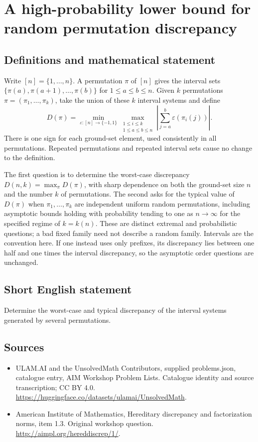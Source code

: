 \documentclass[11pt,a4paper]{article}
\begin{document}
\section*{A high-probability lower bound for random permutation discrepancy}\label{statement}

\subsection{Definitions and mathematical statement}
Write $[n]=\{1,\ldots,n\}$. A permutation $\pi$ of $[n]$ gives the
interval sets $\{\pi(a),\pi(a+1),\ldots,\pi(b)\}$ for
$1\le a\le b\le n$. Given $k$ permutations
$\pi=(\pi_1,\ldots,\pi_k)$, take the union of these $k$
interval systems and define
\[
 D(\pi)=\min_{\varepsilon:[n]\to\{-1,1\}}
 \max_{\substack{1\le i\le k\\1\le a\le b\le n}}
 \left|\sum_{j=a}^b\varepsilon(\pi_i(j))\right|.
\]
There is one sign for each ground-set element, used consistently in all
permutations. Repeated permutations and repeated interval sets cause no
change to the definition.

The first question is to determine the worst-case discrepancy
$D(n,k)=\max_{\pi}D(\pi)$, with sharp dependence
on both the ground-set size $n$ and the number $k$ of permutations.
The second asks for the typical value of $D(\pi)$ when
$\pi_1,\ldots,\pi_k$ are independent uniform random permutations,
including asymptotic bounds holding with probability tending to one as
$n\to\infty$ for the specified regime of $k=k(n)$.
These are distinct extremal and probabilistic questions; a bad fixed
family need not describe a random family. Intervals are the convention
here. If one instead uses only prefixes, its discrepancy lies between
one half and one times the interval discrepancy, so the asymptotic
order questions are unchanged.
\subsection{Short English statement}
Determine the worst-case and typical discrepancy of the interval systems generated by several permutations.
\subsection{Sources}
\begin{itemize}
\item[S1] ULAM.AI and the UnsolvedMath Contributors, supplied problems.json, catalogue entry, AIM Workshop Problem Lists. Catalogue identity and source transcription; CC BY 4.0.
\url{https://huggingface.co/datasets/ulamai/UnsolvedMath}.
\item[S2] American Institute of Mathematics, Hereditary discrepancy and factorization norms, item 1.3. Original workshop question.
\url{http://aimpl.org/hereddiscrep/1/}.
\end{itemize}
\end{document}
